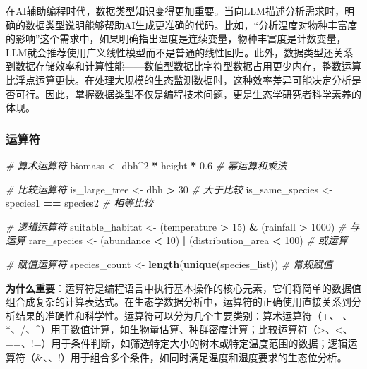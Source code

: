 \documentclass[
]{book}
\newenvironment{Shaded}{\begin{snugshade}}{\end{snugshade}}
\newcommand{\CommentTok}[1]{\textcolor[rgb]{0.56,0.35,0.01}{\textit{#1}}}
\newcommand{\DecValTok}[1]{\textcolor[rgb]{0.00,0.00,0.81}{#1}}
\newcommand{\FloatTok}[1]{\textcolor[rgb]{0.00,0.00,0.81}{#1}}
\newcommand{\FunctionTok}[1]{\textcolor[rgb]{0.13,0.29,0.53}{\textbf{#1}}}
\newcommand{\NormalTok}[1]{#1}
\newcommand{\OtherTok}[1]{\textcolor[rgb]{0.56,0.35,0.01}{#1}}
\newcommand{\SpecialCharTok}[1]{\textcolor[rgb]{0.81,0.36,0.00}{\textbf{#1}}}
\begin{document}
在AI辅助编程时代，数据类型知识变得更加重要。当向LLM描述分析需求时，明确的数据类型说明能够帮助AI生成更准确的代码。比如，``分析温度对物种丰富度的影响''这个需求中，如果明确指出温度是连续变量，物种丰富度是计数变量，LLM就会推荐使用广义线性模型而不是普通的线性回归。此外，数据类型还关系到数据存储效率和计算性能------数值型数据比字符型数据占用更少内存，整数运算比浮点运算更快。在处理大规模的生态监测数据时，这种效率差异可能决定分析是否可行。因此，掌握数据类型不仅是编程技术问题，更是生态学研究者科学素养的体现。

\hypertarget{ux8fd0ux7b97ux7b26}{%
\subsubsection{运算符}\label{ux8fd0ux7b97ux7b26}}

\begin{Shaded}
\begin{Highlighting}[]
\CommentTok{\# 算术运算符}
\NormalTok{biomass }\OtherTok{\textless{}{-}}\NormalTok{ dbh}\SpecialCharTok{\^{}}\DecValTok{2} \SpecialCharTok{*}\NormalTok{ height }\SpecialCharTok{*} \FloatTok{0.6}  \CommentTok{\# 幂运算和乘法}

\CommentTok{\# 比较运算符}
\NormalTok{is\_large\_tree }\OtherTok{\textless{}{-}}\NormalTok{ dbh }\SpecialCharTok{\textgreater{}} \DecValTok{30}  \CommentTok{\# 大于比较}
\NormalTok{is\_same\_species }\OtherTok{\textless{}{-}}\NormalTok{ species1 }\SpecialCharTok{==}\NormalTok{ species2  }\CommentTok{\# 相等比较}

\CommentTok{\# 逻辑运算符}
\NormalTok{suitable\_habitat }\OtherTok{\textless{}{-}}\NormalTok{ (temperature }\SpecialCharTok{\textgreater{}} \DecValTok{15}\NormalTok{) }\SpecialCharTok{\&}\NormalTok{ (rainfall }\SpecialCharTok{\textgreater{}} \DecValTok{1000}\NormalTok{)  }\CommentTok{\# 与运算}
\NormalTok{rare\_species }\OtherTok{\textless{}{-}}\NormalTok{ (abundance }\SpecialCharTok{\textless{}} \DecValTok{10}\NormalTok{) }\SpecialCharTok{|}\NormalTok{ (distribution\_area }\SpecialCharTok{\textless{}} \DecValTok{100}\NormalTok{)  }\CommentTok{\# 或运算}

\CommentTok{\# 赋值运算符}
\NormalTok{species\_count }\OtherTok{\textless{}{-}} \FunctionTok{length}\NormalTok{(}\FunctionTok{unique}\NormalTok{(species\_list))  }\CommentTok{\# 常规赋值}
\end{Highlighting}
\end{Shaded}

\textbf{为什么重要}：运算符是编程语言中执行基本操作的核心元素，它们将简单的数据值组合成复杂的计算表达式。在生态学数据分析中，运算符的正确使用直接关系到分析结果的准确性和科学性。运算符可以分为几个主要类别：算术运算符（+、-、*、/、\^{}）用于数值计算，如生物量估算、种群密度计算；比较运算符（\textgreater、\textless、==、!=）用于条件判断，如筛选特定大小的树木或特定温度范围的数据；逻辑运算符（\&、\textbar、!）用于组合多个条件，如同时满足温度和湿度要求的生态位分析。
\end{document}
